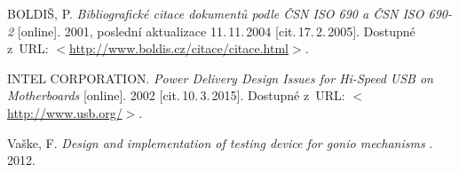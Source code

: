 \begin{literatura}{99}
	
    BOLDIŠ, P.
    \emph{Bibliografické citace dokumentů podle ČSN ISO 690 a ČSN ISO 690-2}\/ [online].
    2001, poslední aktualizace 11.\,11.\,2004 [cit.\,17.\,2.\,2005].
    Dostupné z~URL:
    \(<\)\url{http://www.boldis.cz/citace/citace.html}\(>\).
	

    INTEL CORPORATION.
    \emph{Power Delivery Design Issues for Hi-Speed USB on Motherboards}\/ [online].
    2002 [cit.\,10.\,3.\,2015].
    Dostupné z~URL:
    \(<\)\url{http://www.usb.org/}\(>\).

    Vaške, F.
    \emph{Design and implementation of testing device for gonio mechanisms}\/ .
    2012.



\end{literatura}
